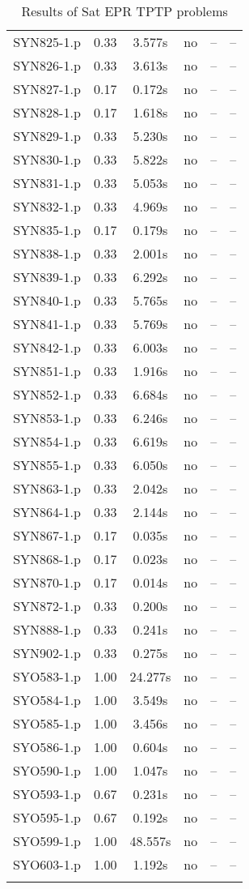 \begin{longtable}{||c | c | c | c | c | c||}
SYN825-1.p & 0.33 & 3.577s & no & -- & -- \\
SYN826-1.p & 0.33 & 3.613s & no & -- & -- \\
SYN827-1.p & 0.17 & 0.172s & no & -- & -- \\
SYN828-1.p & 0.17 & 1.618s & no & -- & -- \\
SYN829-1.p & 0.33 & 5.230s & no & -- & -- \\
SYN830-1.p & 0.33 & 5.822s & no & -- & -- \\
SYN831-1.p & 0.33 & 5.053s & no & -- & -- \\
SYN832-1.p & 0.33 & 4.969s & no & -- & -- \\
SYN835-1.p & 0.17 & 0.179s & no & -- & -- \\
SYN838-1.p & 0.33 & 2.001s & no & -- & -- \\
SYN839-1.p & 0.33 & 6.292s & no & -- & -- \\
SYN840-1.p & 0.33 & 5.765s & no & -- & -- \\
SYN841-1.p & 0.33 & 5.769s & no & -- & -- \\
SYN842-1.p & 0.33 & 6.003s & no & -- & -- \\
SYN851-1.p & 0.33 & 1.916s & no & -- & -- \\
SYN852-1.p & 0.33 & 6.684s & no & -- & -- \\
SYN853-1.p & 0.33 & 6.246s & no & -- & -- \\
SYN854-1.p & 0.33 & 6.619s & no & -- & -- \\
SYN855-1.p & 0.33 & 6.050s & no & -- & -- \\
SYN863-1.p & 0.33 & 2.042s & no & -- & -- \\
SYN864-1.p & 0.33 & 2.144s & no & -- & -- \\
SYN867-1.p & 0.17 & 0.035s & no & -- & -- \\
SYN868-1.p & 0.17 & 0.023s & no & -- & -- \\
SYN870-1.p & 0.17 & 0.014s & no & -- & -- \\
SYN872-1.p & 0.33 & 0.200s & no & -- & -- \\
SYN888-1.p & 0.33 & 0.241s & no & -- & -- \\
SYN902-1.p & 0.33 & 0.275s & no & -- & -- \\
SYO583-1.p & 1.00 & 24.277s & no & -- & -- \\
SYO584-1.p & 1.00 & 3.549s & no & -- & -- \\
SYO585-1.p & 1.00 & 3.456s & no & -- & -- \\
SYO586-1.p & 1.00 & 0.604s & no & -- & -- \\
SYO590-1.p & 1.00 & 1.047s & no & -- & -- \\
SYO593-1.p & 0.67 & 0.231s & no & -- & -- \\
SYO595-1.p & 0.67 & 0.192s & no & -- & -- \\
SYO599-1.p & 1.00 & 48.557s & no & -- & -- \\
SYO603-1.p & 1.00 & 1.192s & no & -- & -- \\
		\bottomrule
		\caption{Results of Sat EPR TPTP problems}
		\label{table:sat_epr_results}
		\end{longtable}

